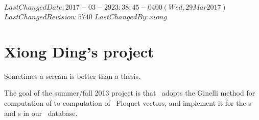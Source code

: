 \ifsvnmulti
 {$LastChangedDate: 2017-03-29 23:38:45 -0400 (Wed, 29 Mar 2017) $}
 {$LastChangedRevision: 5740 $} {$LastChangedBy: xiong $}
\fi

\chapter{Xiong Ding's project}
\label{sect:introXD}

\begin{bartlett}{
Sometimes a scream is better than a thesis.
                }
\end{bartlett}

\bigskip

The goal of the summer/fall 2013 project is that \XD\ adopts the Ginelli
\etal{} method for computation of {\cLvs} to
computation of \po\ Floquet vectors,  and implement it for the \po s and
\rpo s in our \KS\ database.



